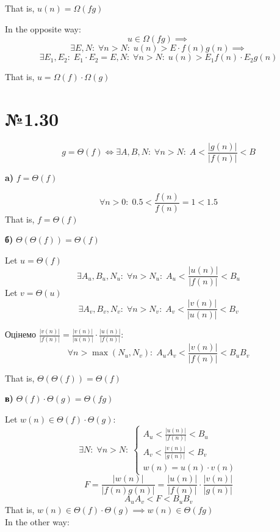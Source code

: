 \documentclass[11pt, a4paper]{article} %
\begin{document}
That is, $u(n) = \Omega(fg)$

In the opposite way:
$$u\in \Omega(f g) \implies$$
$$\exists E, N:\; \forall n>N:\; u(n) > E \cdot f(n)g(n) \implies$$
$$\exists E_1, E_2:\; E_1\cdot E_2 = E, N:\; \forall n>N:\; u(n) > E_1 f(n) \cdot E_2 g(n)$$

That is, $u = \Omega(f) \cdot \Omega(g)$ \qedsymbol

\section*{№1.30}

$$g = \Theta(f) \iff \exists A,B,N:\; \forall n>N:\; A<\frac{|g(n)|}{|f(n)|}<B$$

\begin{mdframed}
    \textbf{a)} $f = \Theta(f)$
\end{mdframed}

$$\forall n>0:\; 0.5 < \frac{f(n)}{f(n)} = 1 < 1.5$$
That is, $f = \Theta(f)$ \qedsymbol

\begin{mdframed}
    \textbf{б)} $\Theta(\Theta(f)) = \Theta(f)$
\end{mdframed}
Let $u = \Theta(f)$
$$\exists A_u,B_u,N_u:\; \forall n>N_u:\; A_u<\frac{|u(n)|}{|f(n)|}<B_u$$
Let $v = \Theta(u)$
$$\exists A_v,B_v,N_v:\; \forall n>N_v:\; A_v<\frac{|v(n)|}{|u(n)|}<B_v$$

Оцінемо $\frac{|v(n)|}{|f(n)|} = \frac{|v(n)|}{|u(n)|}\cdot \frac{|u(n)|}{|f(n)|}$:
$$\forall n>\max(N_u,N_v):\;A_u A_v < \frac{|v(n)|}{|f(n)|} < B_u B_v $$

That is,  $\Theta(\Theta(f)) = \Theta(f)$\qedsymbol

\begin{mdframed}
    \textbf{в)} $\Theta(f)\cdot\Theta(g) = \Theta(fg)$
\end{mdframed}
Let $w(n) \in \Theta(f)\cdot\Theta(g)$:
$$\exists N:\; \forall n>N:\; \begin{cases}
    A_u<\frac{|u(n)|}{|f(n)|}<B_u \\
    A_v<\frac{|v(n)|}{|g(n)|}<B_v \\
    w(n) = u(n) \cdot v(n)
\end{cases}$$
$$F = \frac{|w(n)|}{|f(n)g(n)|} =\frac{|u(n)|}{|f(n)|}\cdot\frac{|v(n)|}{|g(n)|} $$
$$A_u A_v < F < B_u B_v$$
That is, $w(n) \in \Theta(f)\cdot\Theta(g) \implies w(n) \in \Theta(fg)$\\

In the other way:
\end{document}
